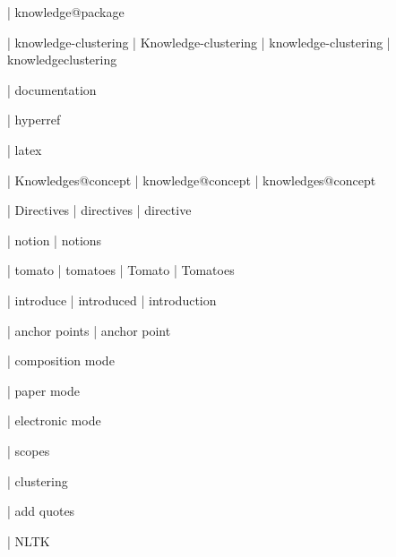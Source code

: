  | knowledge@package

 | knowledge-clustering
 | Knowledge-clustering
 | knowledge-cluste\-ring
 | knowledge\-clustering

 | documentation

 | hyperref

 | latex

 | Knowledges@concept
 | knowledge@concept
 | knowledges@concept

 | Directives
 | directives
 | directive

 | notion
 | notions

 | tomato
 | tomatoes
 | Tomato
 | Tomatoes

 | introduce
 | introduced
 | introduction

 | anchor points
 | anchor point

 | composition mode

 | paper mode

 | electronic mode

 | scopes

 | clustering

 | add quotes

 | NLTK